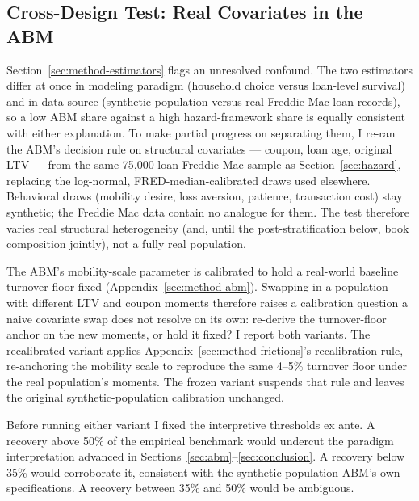 \documentclass[12pt]{article}
\begin{document}
\subsection{Cross-Design Test: Real Covariates in the ABM}\label{sec:robustness-crossdesign}

Section~\ref{sec:method-estimators} flags an unresolved confound. The two estimators differ at once in modeling paradigm (household choice versus loan-level survival) and in data source (synthetic population versus real Freddie Mac loan records), so a low ABM share against a high hazard-framework share is equally consistent with either explanation. To make partial progress on separating them, I re-ran the ABM's decision rule on structural covariates --- coupon, loan age, original LTV --- from the same 75,000-loan Freddie Mac sample as Section~\ref{sec:hazard}, replacing the log-normal, FRED-median-calibrated draws used elsewhere. Behavioral draws (mobility desire, loss aversion, patience, transaction cost) stay synthetic; the Freddie Mac data contain no analogue for them. The test therefore varies real structural heterogeneity (and, until the post-stratification below, book composition jointly), not a fully real population.

The ABM's mobility-scale parameter is calibrated to hold a real-world baseline turnover floor fixed (Appendix~\ref{sec:method-abm}). Swapping in a population with different LTV and coupon moments therefore raises a calibration question a naive covariate swap does not resolve on its own: re-derive the turnover-floor anchor on the new moments, or hold it fixed? I report both variants. The recalibrated variant applies Appendix~\ref{sec:method-frictions}'s recalibration rule, re-anchoring the mobility scale to reproduce the same 4--5\% turnover floor under the real population's moments. The frozen variant suspends that rule and leaves the original synthetic-population calibration unchanged.

Before running either variant I fixed the interpretive thresholds ex ante. A recovery above 50\% of the empirical benchmark would undercut the paradigm interpretation advanced in Sections~\ref{sec:abm}--\ref{sec:conclusion}. A recovery below 35\% would corroborate it, consistent with the synthetic-population ABM's own specifications. A recovery between 35\% and 50\% would be ambiguous.
\end{document}
